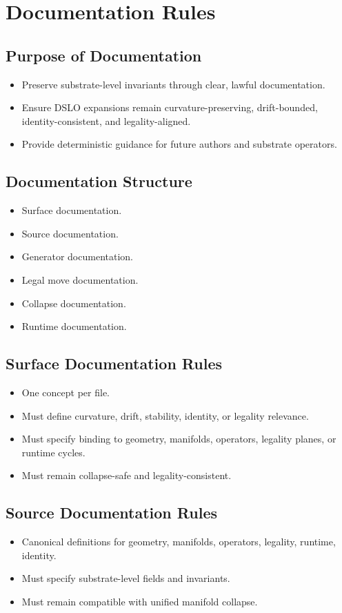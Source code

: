 \section{Documentation Rules}

\subsection{Purpose of Documentation}
\begin{itemize}
    \item Preserve substrate-level invariants through clear, lawful documentation.
    \item Ensure DSLO expansions remain curvature-preserving, drift-bounded, identity-consistent, and legality-aligned.
    \item Provide deterministic guidance for future authors and substrate operators.
\end{itemize}

\subsection{Documentation Structure}
\begin{itemize}
    \item Surface documentation.
    \item Source documentation.
    \item Generator documentation.
    \item Legal move documentation.
    \item Collapse documentation.
    \item Runtime documentation.
\end{itemize}

\subsection{Surface Documentation Rules}
\begin{itemize}
    \item One concept per file.
    \item Must define curvature, drift, stability, identity, or legality relevance.
    \item Must specify binding to geometry, manifolds, operators, legality planes, or runtime cycles.
    \item Must remain collapse-safe and legality-consistent.
\end{itemize}

\subsection{Source Documentation Rules}
\begin{itemize}
    \item Canonical definitions for geometry, manifolds, operators, legality, runtime, identity.
    \item Must specify substrate-level fields and invariants.
    \item Must remain compatible with unified manifold collapse.
\end{itemize}

